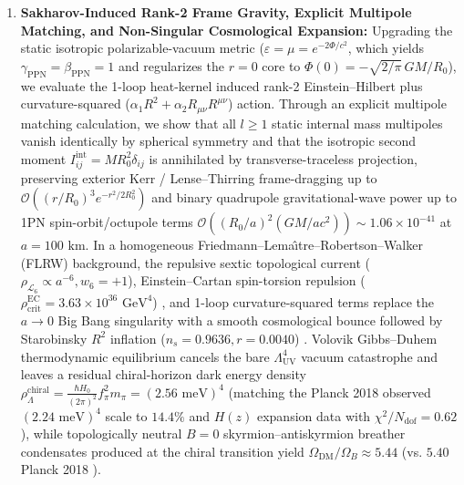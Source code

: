 \documentclass[10pt,aps,prd,twocolumn,superscriptaddress,nofootinbib,floatfix,longbibliography,showkeys]{revtex4-2}
\begin{document}
\begin{enumerate}
  \item \textbf{Sakharov-Induced Rank-2 Frame Gravity, Explicit Multipole Matching, and Non-Singular Cosmological Expansion:} Upgrading the static isotropic polarizable-vacuum metric ($\varepsilon = \mu = e^{-2\Phi/c^2}$, which yields $\gamma_{\text{PPN}}=\beta_{\text{PPN}}=1$ \cite{ref21} and regularizes the $r=0$ core to $\Phi(0) = -\sqrt{2/\pi}\,GM/R_0$), we evaluate the 1-loop heat-kernel induced rank-2 Einstein--Hilbert plus curvature-squared ($\alpha_1 R^2 + \alpha_2 R_{\mu\nu}R^{\mu\nu}$) action. Through an explicit multipole matching calculation, we show that all $l \ge 1$ static internal mass multipoles vanish identically by spherical symmetry and that the isotropic second moment $I_{ij}^{\text{int}} = M R_0^2 \delta_{ij}$ is annihilated by transverse-traceless projection, preserving exterior Kerr / Lense--Thirring frame-dragging up to $\mathcal{O}((r/R_0)^3 e^{-r^2/2R_0^2})$ and binary quadrupole gravitational-wave power up to 1PN spin-orbit/octupole terms $\mathcal{O}((R_0/a)^2 (GM/ac^2)) \sim 1.06 \times 10^{-41}$ at $a = 100\text{ km}$. In a homogeneous Friedmann--Lema\^{\i}tre--Robertson--Walker (FLRW) background, the repulsive sextic topological current ($\rho_{\mathcal{L}_6} \propto a^{-6}, w_6 = +1$), Einstein--Cartan spin-torsion repulsion ($\rho_{\text{crit}}^{\text{EC}} = 3.63 \times 10^{36}\text{ GeV}^4$) \cite{ref22,ref23,ref24,ref25,ref26}, and 1-loop curvature-squared terms replace the $a \to 0$ Big Bang singularity with a smooth cosmological bounce followed by Starobinsky $R^2$ inflation ($n_s = 0.9636, r = 0.0040$) \cite{ref27,ref28,ref29}. Volovik Gibbs--Duhem thermodynamic equilibrium cancels the bare $\Lambda_{\text{UV}}^4$ vacuum catastrophe and leaves a residual chiral-horizon dark energy density $\rho_\Lambda^{\text{chiral}} = \frac{\hbar H_0}{(2\pi)^2}f_\pi^2 m_\pi = (2.56\text{ meV})^4$ \cite{ref25,ref26,ref30,ref31,ref32} (matching the Planck 2018 observed $(2.24\text{ meV})^4$ scale \cite{ref28,ref29} to $14.4\%$ and $H(z)$ expansion data with $\chi^2/N_{\text{dof}} = 0.62$), while topologically neutral $B=0$ skyrmion--antiskyrmion breather condensates produced at the chiral transition yield $\Omega_{\text{DM}}/\Omega_B \approx 5.44$ (vs. $5.40$ Planck 2018 \cite{ref28,ref29}).

\end{enumerate}
\end{document}
